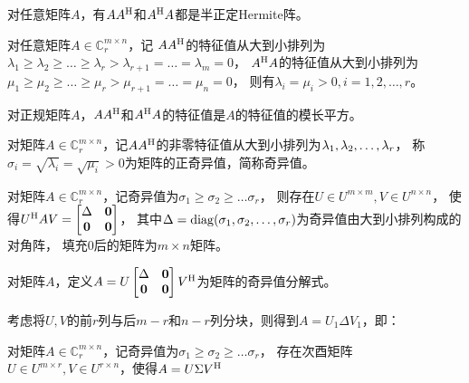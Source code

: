 \begin{lemma}
    对任意矩阵$A$，有$AA^\mathrm{H}$和$A^\mathrm{H} A$都是半正定Hermite阵。
\end{lemma}

\begin{theorem}
    对任意矩阵$A\in \mathbb{C}^{m\times n}_r$，记
    $AA^\mathrm{H}$的特征值从大到小排列为$\lambda_1\geq \lambda_2\geq \dots \geq \lambda_r > \lambda_{r+1}=\dots = \lambda_m = 0$，
    $A^\mathrm{H} A$的特征值从大到小排列为$\mu_1\geq \mu_2\geq \dots \geq \mu_r > \mu_{r+1}=\dots = \mu_n = 0$，
    则有$\lambda_i = \mu_i >0, i=1,2,\dots,r$。
\end{theorem}

\begin{theorem}
    对正规矩阵$A$，$AA^\mathrm{H}$和$A^\mathrm{H} A$的特征值是$A$的特征值的模长平方。
\end{theorem}

\begin{definition}[奇异值]
    对矩阵$A\in \mathbb{C}^{m\times n}_r$，记$AA^\mathrm{H}$的非零特征值从大到小排列为$\VectorComma{\lambda}{r}$，
    称$\sigma_i = \sqrt{\lambda_i} = \sqrt{\mu_i} > 0$为矩阵的正奇异值，简称奇异值。
\end{definition}

\begin{theorem}
    对矩阵$A\in \mathbb{C}^{m\times n}_r$，记奇异值为$\sigma_1\geq \sigma_2\geq \dots \sigma_r$，
    则存在$U\in U^{m\times m},V\in U^{n\times n}$，
    使得$U^\mathrm{H} AV=\begin{bmatrix}\Delta & \bm{0} \\ \bm{0} & \bm{0} \end{bmatrix}$，
    其中$\Delta = \DiagMatrix(\VectorComma{\sigma}{r})$为奇异值由大到小排列构成的对角阵，
    填充$0$后的矩阵为$m\times n$矩阵。
\end{theorem}

\begin{definition}[奇异值分解]
    对矩阵$A$，定义$A=U\begin{bmatrix}\Delta & \bm{0} \\ \bm{0} & \bm{0} \end{bmatrix} V^\mathrm{H}$为矩阵的奇异值分解式。
\end{definition}

考虑将$U,V$的前$r$列与后$m-r$和$n-r$列分块，则得到$A=U_1 \Delta V_1$，即：
\begin{corollary}
    对矩阵$A\in \mathbb{C}^{m\times n}_r$，记奇异值为$\sigma_1\geq \sigma_2\geq \dots \sigma_r$，
    存在次酉矩阵$U\in U^{m\times r},V\in U^{r\times n}$，使得$A = U \Sigma V^\mathrm{H}$
\end{corollary}

